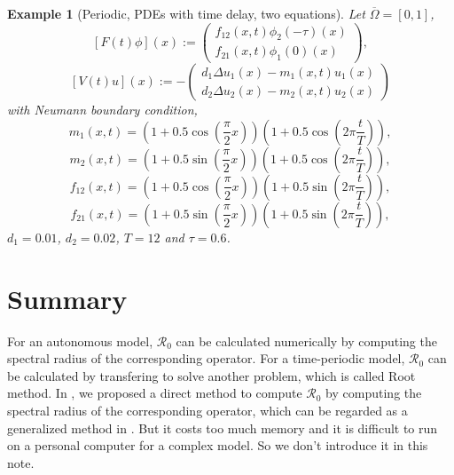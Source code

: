 \documentclass[12pt,reqno]{article}
\newtheorem{example}{Example}
\newcommand{\oOmega}{\overline{\Omega}}
\newcommand{\R}{\mathcal{R}_0}
\begin{document}
\begin{example}[Periodic, PDEs with time delay, two equations] Let $\oOmega=[0,1]$,
	$$[F(t) \phi](x) := 	\left(
	\begin{matrix}
	f_{12} (x,t) \phi_2(-\tau)(x) \\
	f_{21} (x,t) \phi_1(0)(x)
	\end{matrix}
	\right),$$
	$$[V(t) u](x) :=-	
	\left(
	\begin{matrix}
	d_1 \Delta u_1(x) - m_1(x,t) u_1(x) \\
	d_2 \Delta u_2(x) - m_2(x,t) u_2(x)
	\end{matrix}
	\right)$$ with Neumann boundary condition,
	$$m_1(x,t)=(1+0.5\cos(\frac{\pi}{2} x))(1+0.5\cos(2\pi \frac{t}{T})),$$
	$$m_2(x,t)=(1+0.5\sin(\frac{\pi}{2} x))(1+0.5\cos(2\pi \frac{t}{T})),$$
	$$f_{12}(x,t)=(1 +0.5 \cos(\frac{\pi}{2} x))(1+0.5\sin(2\pi \frac{t}{T})),$$
	$$f_{21}(x,t)=(1 +0.5 \sin(\frac{\pi}{2} x))(1+0.5\sin(2\pi \frac{t}{T})),$$
	$d_1=0.01$, $d_2=0.02$, $T=12$ and $\tau=0.6$.
\end{example}

\section{Summary}\label{sec:summary}

For an autonomous model, $\R$ can be calculated numerically by computing the spectral radius of the corresponding operator. For a time-periodic model, $\R$ can be calculated by transfering to solve another problem, which is called Root method. In \cite{yang2018remarks}, we proposed a direct method to compute $\R$ by computing the spectral radius of the corresponding operator, which can be regarded as a generalized method in \cite{posny2014computing}. But it costs too much memory and it is difficult to run on a personal computer for a complex model. So we don't introduce it in this note.
%
%
\end{document}
